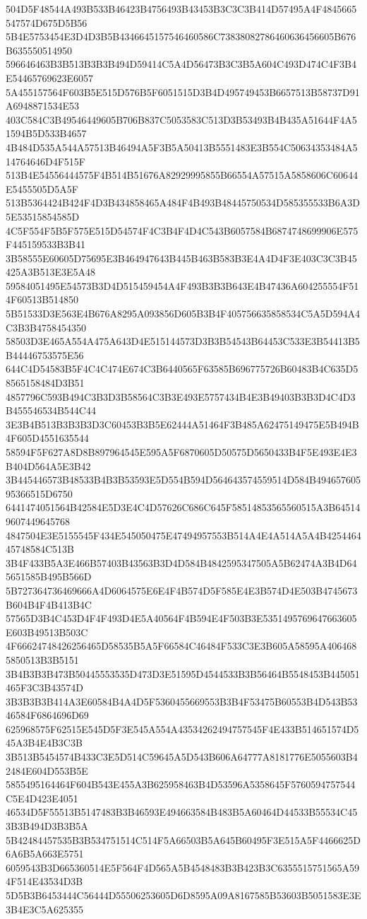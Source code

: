 {{{{{{{{{{{{{{{{{{{{{504D5F48544A493B533B46423B4756493B43453B3C3C3B414D57495A4F4845665547574D675D5B56
5B4E5753454E3D4D3B5B4346645157546460586C73838082786460636456605B676B635550514950
596646463B3B513B3B3B494D59414C5A4D56473B3C3B5A604C493D474C4F3B4E54465769623E6057
5A455157564F603B5E515D576B5F6051515D3B4D495749453B6657513B58737D91A6948871534E53
403C584C3B49546449605B706B837C5053583C513D3B53493B4B435A51644F4A51594B5D533B4657
4B484D535A544A57513B46494A5F3B5A50413B5551483E3B554C50634353484A514764646D4F515F
513B4E54556444575F4B514B51676A82929995855B66554A57515A5858606C60644E5455505D5A5F
513B5364424B424F4D3B434858465A484F4B493B48445750534D585355533B6A3D5E53515854585D
4C5F554F5B5F575E515D54574F4C3B4F4D4C543B6057584B6874748699906E575F445159533B3B41
3B58555E60605D75695E3B464947643B445B463B583B3E4A4D4F3E403C3C3B45425A3B513E3E5A48
59584051495E54573B3D4D515459454A4F493B3B3B643E4B47436A604255554F514F60513B514850
5B51533D3E563E4B676A8295A093856D605B3B4F405756635858534C5A5D594A4C3B3B4758454350
58503D3E465A554A475A643D4E515144573D3B3B54543B64453C533E3B54413B5B44446753575E56
644C4D54583B5F4C4C474E674C3B6440565F63585B696775726B60483B4C635D58565158484D3B51
4857796C593B494C3B3D3B58564C3B3E493E5757434B4E3B49403B3B3D4C4D3B455546534B544C44
3E3B4B513B3B3B3D3C60453B3B5E62444A51464F3B485A62475149475E5B494B4F605D4551635544
58594F5F627A8D8B897964545E595A5F6870605D50575D5650433B4F5E493E4E3B404D564A5E3B42
3B445446573B48533B4B3B53593E5D554B594D564643574559514D584B49465760595366515D6750
6441474051564B42584E5D3E4C4D57626C686C645F58514853565560515A3B645149607449645768
4847504E3E5155545F434E545050475E47494957553B514A4E4A514A5A4B425446445748584C513B
3B4F433B5A3E466B57403B43563B3D4D584B4842595347505A5B62474A3B4D645651585B495B566D
5B727364736469666A4D6064575E6E4F4B574D5F585E4E3B574D4E503B4745673B604B4F4B413B4C
57565D3B4C453D4F4F493D4E5A40564F4B594E4F503B3E5351495769647663605E603B49513B503C
4F66624748426256465D58535B5A5F66584C46484F533C3E3B605A58595A4064685850513B3B5151
3B4B3B3B473B50445553535D473D3E51595D4544533B3B56464B5548453B445051465F3C3B43574D
3B3B3B3B414A3E60584B4A4D5F5360455669553B3B4F53475B60553B4D543B5346584F6864696D69
625968575F62515E545D5F3E545A554A43534262494757545F4E433B514651574D545A3B4E4B3C3B
3B513B5454574B433C3E5D514C59645A5D543B606A64777A8181776E5055603B42484E604D553B5E
5855495164464F604B543E455A3B625958463B4D53596A5358645F5760594757544C5E4D423E4051
46534D5F55513B5147483B3B46593E494663584B483B5A60464D44533B55534C453B3B494D3B3B5A
5B42484457535B3B534751514C514F5A66503B5A645B60495F3E515A5F4466625D6A6B5A663E5751
6059543B3D665360514E5F564F4D565A5B4548483B3B423B3C6355515751565A594F514E43534D3B
5D5B3B6453444C56444D55506253605D6D8595A09A8167585B53603B5051583E3E3B4E3C5A625355
}}}}}}}}}}}}}}}}}}}}}
